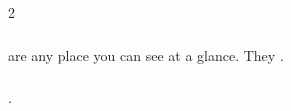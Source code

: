 \begin{multicols}{2}
\subsubsection{}
are any place you can see at a glance.
They .

\subsubsection{}
.%

\end{multicols}

